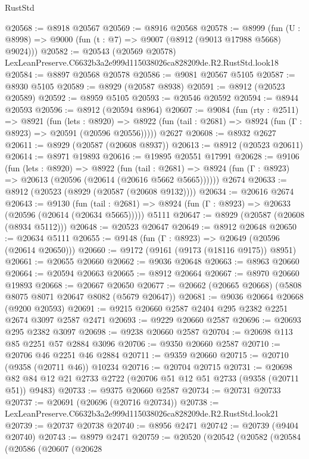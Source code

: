 \begin{lexlean}{RustStd}
\begin{coremodule}
@20568 := @8918 @20567
@20569 := @8916 @20568
@20578 := @8999
    (fun (U : @8998) => @9000 (fun (t : @7) => @9007 (@8912 (@9013 @17988 @5668) @9024)))
@20582 := @20543 (@20569 @20578) LexLeanPreserve.C6632b3a2e999d115038026ca828209de.R2.RustStd.look18
@20584 := @8897 @20568 @20578
@20586 := @9081 @20567 @5105
@20587 := @8930 @5105
@20589 := @8929 (@20587 @8938)
@20591 := @8912 (@20523 @20589)
@20592 := @8959 @5105
@20593 := @20546 @20592
@20594 := @8944 @20593
@20596 := @8912 (@20594 @8964)
@20607 := @9084
    (fun (rty : @2511) =>
    @8921
      (fun (lets : @8920) =>
      @8922 (fun (tail : @2681) => @8924 (fun (Γ : @8923) => @20591 (@20596 @20556)))))
    @2627
@20608 := @8932 @2627
@20611 := @8929 (@20587 (@20608 @8937))
@20613 := @8912 (@20523 @20611)
@20614 := @8971 @19893
@20616 := @19895 @20551 @17991
@20628 := @9106
    (fun (lets : @8920) =>
    @8922
      (fun (tail : @2681) =>
      @8924 (fun (Γ : @8923) => @20613 (@20596 (@20614 (@20616 @5662 @5665))))))
    @2674
@20633 := @8912 (@20523 (@8929 (@20587 (@20608 @9132))))
@20634 := @20616 @2674
@20643 := @9130
    (fun (tail : @2681) => @8924 (fun (Γ : @8923) => @20633 (@20596 (@20614 (@20634 @5665)))))
    @5111
@20647 := @8929 (@20587 (@20608 (@8934 @5112)))
@20648 := @20523 @20647
@20649 := @8912 @20648
@20650 := @20634 @5111
@20655 := @9148 (fun (Γ : @8923) => @20649 (@20596 (@20614 @20650)))
@20660 := @9172 (@9161 (@9173 (@18116 @9175)) @8951)
@20661 := @20655 @20660
@20662 := @9036 @20648
@20663 := @8963 @20660
@20664 := @20594 @20663
@20665 := @8912 @20664
@20667 := @8970 @20660 @19893
@20668 := @20667 @20650
@20677 := @20662 (@20665 @20668) (@5808 @8075 @8071 @20647 @8082 (@5679 @20647))
@20681 := @9036 @20664 @20668 (@9200 @20593)
@20691 := @9215 @20660 @2587 @2404 @295 @2382 @2251 @2674 @3097 @2587 @2471
@20693 := @9229 @20660 @2587
@20696 := @20693 @295 @2382 @3097
@20698 := @9238 @20660 @2587
@20704 := @20698 @113 @85 @2251 @57 @2884 @3096
@20706 := @9350 @20660 @2587
@20710 := @20706 @46 @2251 @46 @2884
@20711 := @9359 @20660
@20715 := @20710 (@9358 (@20711 @46)) @10234
@20716 := @20704 @20715
@20731 := @20698 @82 @84 @12 @21 @2733 @2722 (@20706 @51 @12 @51 @2733 (@9358 (@20711 @51)) @9483)
@20733 := @9375 @20660 @2587
@20734 := @20731 @20733
@20737 := @20691 (@20696 (@20716 @20734))
@20738 := LexLeanPreserve.C6632b3a2e999d115038026ca828209de.R2.RustStd.look21
@20739 := @20737 @20738
@20740 := @8956 @2471
@20742 := @20739 (@9404 @20740)
@20743 := @8979 @2471
@20759 := @20520
    (@20542
      (@20582
        (@20584
          (@20586
            (@20607
              (@20628

\end{coremodule}
\end{lexlean}

